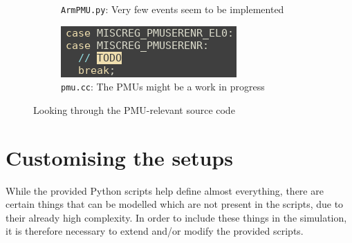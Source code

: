 \begin{figure}[H]
\begin{subfigure}{0.64\textwidth}
        \caption{\texttt{ArmPMU.py}: Very few events seem to be implemented}
    \end{subfigure}
    \hfill
    \begin{subfigure}{0.35\textwidth}
        \centering
        \includegraphics[width=\linewidth]{screenshots/sim-pmu/pmu-todo.png}
        \caption{\texttt{pmu.cc}: The PMUs might be a work in progress}
    \end{subfigure}
    \caption{Looking through the PMU-relevant source code}
    \label{fig:pmu-src}
\end{figure}
    
\section{Customising the setups}
While the provided Python scripts help define almost everything, there are 
certain things that can be modelled which are not present in the scripts, due to
their already high complexity. In order to include these things in the 
simulation, it is therefore necessary to extend and/or modify the provided 
scripts.

